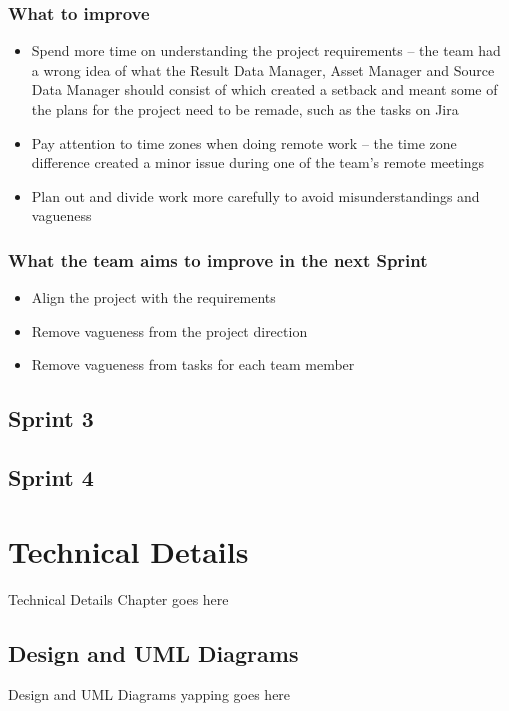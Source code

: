 \documentclass[12pt]{report}
\begin{document}
\subsection*{What to improve}
\begin{itemize}
    \item Spend more time on understanding the project requirements -- the team had a wrong idea of what the Result Data Manager, Asset Manager and Source Data Manager should consist of which created a setback and meant some of the plans for the project need to be remade, such as the tasks on Jira
    \item Pay attention to time zones when doing remote work -- the time zone difference created a minor issue during one of the team's remote meetings
    \item Plan out and divide work more carefully to avoid misunderstandings and vagueness
\end{itemize}

\subsection*{What the team aims to improve in the next Sprint}
\begin{itemize}
    \item Align the project with the requirements
    \item Remove vagueness from the project direction
    \item Remove vagueness from tasks for each team member
\end{itemize}


\section{Sprint 3}
\section{Sprint 4}


\chapter{Technical Details}
Technical Details Chapter goes here

\section{Design and UML Diagrams}
Design and UML Diagrams yapping goes here
\end{document}
